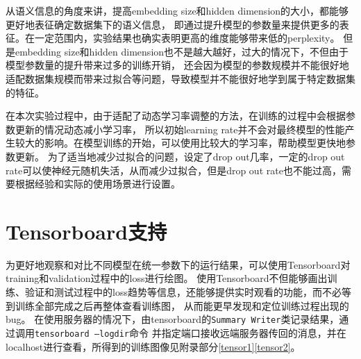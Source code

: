\documentclass[]{ctexart}
\begin{document}
从语义信息的角度来讲，提高embedding size和hidden dimension的大小，都能够更好地表征确定数据集下的语义信息，
即通过提升模型的参数量来提供更多的表征。在一定范围内，实验结果也确实表明更高的维度能够带来低的perplexity。
但是embedding size和hidden dimension也不是越大越好，过大的情况下，不但由于模型参数量的提升带来过多的训练开销，
还会因为模型的参数规模并不能很好地适配数据集规模而带来过拟合等问题，导致模型并不能很好地学到属于特定数据集的特征。

在本次实验过程中，由于适配了动态学习率调整的方法，在训练的过程中会根据参数更新的情况动态减小学习率，
所以初始learning rate并不会对最终模型的性能产生较大的影响。在模型训练的开始，可以使用比较大的学习率，帮助模型更快地参数更新。
为了适当地减少过拟合的问题，设定了drop out几率，一定的drop out rate可以使神经元随机失活，从而减少过拟合，但是drop out rate也不能过高，需要根据经验和实际的使用场景进行设置。

\section{Tensorboard支持}
为更好地观察和对比不同模型在统一参数下的运行结果，可以使用Tensorboard对training和validation过程中的loss进行绘图。
使用Tensorboard不但能够画出训练、验证和测试过程中的loss趋势等信息，还能够提供实时观看的功能，而不必等到训练全部完成之后再整体查看训练图，
从而能更早发现和定位训练过程出现的bug。
在使用服务器的情况下，由tensorboard的\texttt{Summary Writer}类记录结果，通过调用\texttt{tensorboard --logdir}命令
并指定端口接收远端服务器传回的消息，并在localhost进行查看，所得到的训练图像见附录部分\ref{tensor1}\ref{tensor2}。



\newpage
\end{document}
